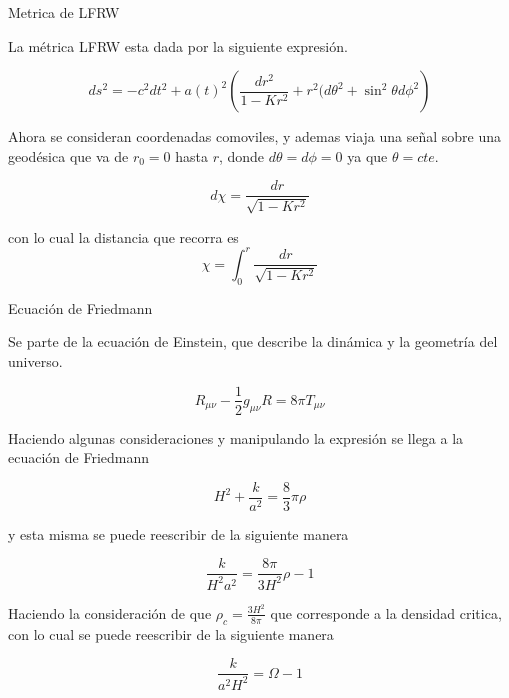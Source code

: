 \documentclass[10pt]{beamer}
\begin{document}
\begin{frame}{Metrica de LFRW}

La métrica LFRW esta dada por la siguiente expresión.

\begin{equation}
ds^2 = -c^2dt^2 + a(t)^2\left(\frac{dr^2}{1-Kr^2} + r^2(d\theta^2 + \sin^2\theta d\phi^2\right)
\end{equation}

Ahora se consideran coordenadas comoviles, y ademas viaja una señal sobre una geodésica que va de $r_0=0$ hasta $r$, donde $d\theta=d\phi=0$ ya que $\theta=cte$.

\begin{equation}
d\chi = \frac{dr}{\sqrt{1-Kr^2}}
\end{equation}

con lo cual la distancia que recorra es 
\begin{equation}
\chi = \int_0^r\frac{dr}{\sqrt{1-Kr^2}}
\end{equation}

\end{frame}

\begin{frame}{Ecuación de Friedmann}

Se parte de la ecuación de Einstein, que describe la dinámica y la geometría del universo.

\begin{equation}
R_{\mu\nu} - \frac{1}{2}g_{\mu\nu}R = 8\pi T_{\mu\nu}
\end{equation}

Haciendo algunas consideraciones y manipulando la expresión se llega a la ecuación de Friedmann

\begin{equation}
H^2 + \frac{k}{a^2} = \frac{8}{3}\pi\rho
\end{equation}

y esta misma se puede reescribir de la siguiente manera

\begin{equation}
\frac{k}{H^2a^2} = \frac{8\pi}{3H^2}\rho - 1
\end{equation}

Haciendo la consideración de que  $\rho_c = \frac{3H^2}{8\pi}$ que corresponde a la densidad critica, con lo cual se puede reescribir de la siguiente manera

\begin{equation}
\frac{k}{a^2H^2} = \Omega - 1
\end{equation}

\end{frame}
\end{document}
